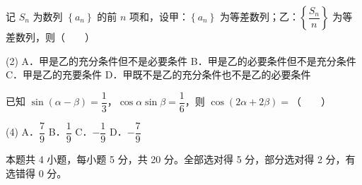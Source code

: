\begin{question}
记 $S_n$ 为数列 $\left\{a_n\right\}$ 的前 $n$ 项和，设甲：$\left\{a_n\right\}$ 为等差数列；乙：$\left\{\dfrac{S_n}n\right\}$ 为等差数列，则\mbox{（　　）}

\begin{gkopts}(2)
\task A．甲是乙的充分条件但不是必要条件
\task B．甲是乙的必要条件但不是充分条件
\task C．甲是乙的充要条件
\task D．甲既不是乙的充分条件也不是乙的必要条件
\end{gkopts}

\end{question}
\begin{question}
已知 $\sin(\alpha-\beta)=\dfrac13$，$\cos\alpha\sin\beta=\dfrac16$，则 $\cos(2\alpha+2\beta)=$\mbox{（　　）}

\begin{gkopts}(4)
\task A．$\dfrac79$
\task B．$\dfrac19$
\task C．$-\dfrac19$
\task D．$-\dfrac79$
\end{gkopts}

\par\medskip

\end{question}

\begin{gktip}
本题共 4 小题，每小题 5 分，共 20 分。全部选对得 5 分，部分选对得 2 分，有选错得 0 分。
\end{gktip}

